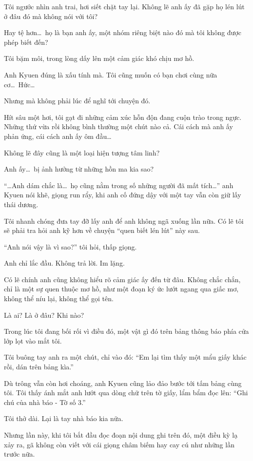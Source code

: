 \documentclass[../main.tex]{subfiles}
\begin{document}
Tôi ngước nhìn anh trai, hơi siết chặt tay lại. Không lẽ anh ấy đã gặp họ lén lút ở đâu đó mà không nói với tôi?

Hay tệ hơn\dots\ họ là bạn anh ấy, một nhóm riêng biệt nào đó mà tôi không được phép biết đến?

Tôi bặm môi, trong lòng dấy lên một cảm giác khó chịu mơ hồ.

Anh Kyuen đúng là xấu tính mà. Tôi cũng muốn có bạn chơi cùng nữa cơ\dots\ Hức\dots

Nhưng mà không phải lúc để nghĩ tới chuyện đó.

Hít sâu một hơi, tôi gạt đi những cảm xúc hỗn độn đang cuộn trào trong ngực. Những thứ vừa rồi không bình thường một chút nào cả. Cái cách mà anh ấy phản ứng, cái cách anh ấy ôm đầu\dots

Không lẽ đây cũng là một loại hiện tượng tâm linh?

Anh ấy\dots\ bị ảnh hưởng từ những hồn ma kia sao?

``\dots Anh dám chắc là\dots\ họ cũng nằm trong số những người đã mất tích\dots'' anh Kyuen nói khẽ, giọng run rẩy, khi anh cố đứng dậy với một tay vẫn còn giữ lấy thái dương.

Tôi nhanh chóng đưa tay đỡ lấy anh để anh không ngã xuống lần nữa. Có lẽ tôi sẽ phải tra hỏi anh kỹ hơn về chuyện ``quen biết lén lút'' này sau.

``Anh nói vậy là vì sao?'' tôi hỏi, thấp giọng.

Anh chỉ lắc đầu. Không trả lời. Im lặng.

Có lẽ chính anh cũng không hiểu rõ cảm giác ấy đến từ đâu. Không chắc chắn, chỉ là một sự quen thuộc mơ hồ, như một đoạn ký ức lướt ngang qua giấc mơ, không thể níu lại, không thể gọi tên.

Là ai? Là ở đâu? Khi nào?

Trong lúc tôi đang bối rối vì điều đó, một vật gì đó trên bảng thông báo phía cửa lớp lọt vào mắt tôi.

Tôi buông tay anh ra một chút, chỉ vào đó: ``Em lại tìm thấy một mẩu giấy khác rồi, dán trên bảng kìa.''

Dù trông vẫn còn hơi choáng, anh Kyuen cũng lảo đảo bước tới tấm bảng cùng tôi. Tôi thấy ánh mắt anh lướt qua dòng chữ trên tờ giấy, lẩm bẩm đọc lên: ``{\vnmsans Ghi chú của nhà báo - Tờ số 3.}''

Tôi thở dài. Lại là tay nhà báo kia nữa.

Nhưng lần này, khi tôi bắt đầu đọc đoạn nội dung ghi trên đó, một điều kỳ lạ xảy ra, gã không còn viết với cái giọng châm biếm hay cay cú như những lần trước nữa.
\end{document}
